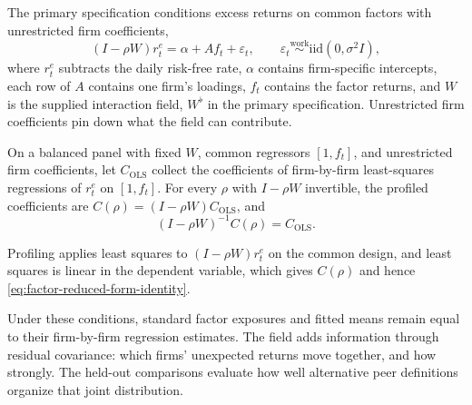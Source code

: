 The primary specification conditions excess returns on common factors with
unrestricted firm coefficients,
\begin{equation}\label{eq:factor-spatial-lag}
  (I-\rho W)r_t^e
  =\alpha+A f_t+\varepsilon_t,
  \qquad \varepsilon_t\mathrel{\overset{\mathrm{work}}{\sim}}
  \mathrm{iid}(0,\sigma^2I),
\end{equation}
where $r_t^e$ subtracts the daily risk-free rate, $\alpha$ contains
firm-specific intercepts, each row of $A$ contains one firm's loadings, $f_t$
contains the factor returns, and $W$ is the supplied interaction field,
$W^\flat$ in the primary specification.
Unrestricted firm coefficients pin down what the field can contribute.

\begin{proposition}\label{prop:factor-beta-invariance}
  On a balanced panel with fixed $W$, common regressors $[1,f_t]$, and
  unrestricted firm coefficients, let $C_{\mathrm{OLS}}$ collect the
  coefficients of firm-by-firm least-squares regressions of $r_t^e$ on
  $[1,f_t]$.
  For every $\rho$ with $I-\rho W$ invertible, the profiled coefficients are
  $C(\rho)=(I-\rho W)C_{\mathrm{OLS}}$, and
  \begin{equation}\label{eq:factor-reduced-form-identity}
    (I-\rho W)^{-1}C(\rho)=C_{\mathrm{OLS}}.
  \end{equation}
\end{proposition}
Profiling applies least squares to $(I-\rho W)r_t^e$ on the common design, and
least squares is linear in the dependent variable, which gives $C(\rho)$ and
hence \eqref{eq:factor-reduced-form-identity}.

Under these conditions, standard factor exposures and fitted means remain
equal to their firm-by-firm regression estimates.
The field adds information through residual covariance: which firms'
unexpected returns move together, and how strongly.
The held-out comparisons evaluate how well alternative peer definitions
organize that joint distribution.
